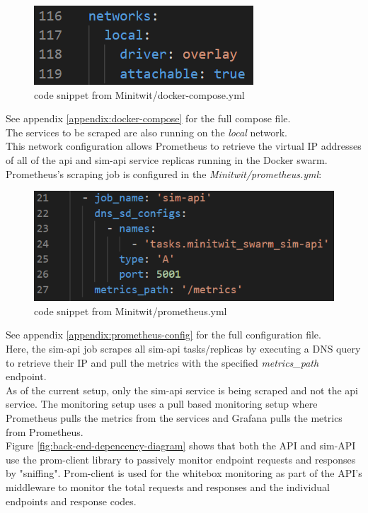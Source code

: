 \begin{figure}[H]
    \centering
    \includegraphics[width=0.4\linewidth]{report/images/LocalNetwork1.png}
    \caption{code snippet from Minitwit/docker-compose.yml}
    \label{fig:docker-compose-overlay}
\end{figure}
\noindent See appendix \ref{appendix:docker-compose} for the full compose file.\\
The services to be scraped are also running on the \textit{local} network.\\
This network configuration allows Prometheus to retrieve the virtual IP addresses of all of the api and sim-api service replicas running in the Docker swarm. Prometheus's scraping job is configured in the \textit{Minitwit/prometheus.yml}:

\begin{figure}[H]
    \centering
    \includegraphics[width=0.66\linewidth]{report/images/LocalNetwork2.png}
    \caption{code snippet from Minitwit/prometheus.yml}
    \label{fig:prometheus-scraping}
\end{figure}
\noindent See appendix \ref{appendix:prometheus-config} for the full configuration file.\\
Here, the sim-api job scrapes all sim-api tasks/replicas by executing a DNS query to retrieve their IP and pull the metrics with the specified \textit{metrics\_path} endpoint.\\
As of the current setup, only the sim-api service is being scraped and not the api service.
The monitoring setup uses a pull based monitoring setup where Prometheus pulls the metrics from the services and Grafana pulls the metrics from Prometheus.\\

Figure \ref{fig:back-end-depencency-diagram} shows that both the API and sim-API use the prom-client library to passively monitor endpoint requests and responses by "sniffing".
Prom-client is used for the whitebox monitoring as part of the API's middleware to monitor the total requests and responses and the individual endpoints and response codes.
\\


